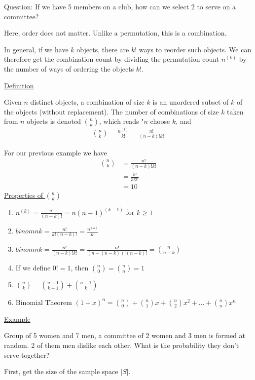 \documentclass{article}
\begin{document}
Question: If we have 5 members on a club, how can we select 2 to serve on a committee?

Here, order does not matter. Unlike a permutation, this is a combination. 

In general, if we have $k$ objects, there are $k!$ ways to reorder such objects. We can therefore get the combination count by dividing the permutation count $n^{(k)}$ by the number of ways of ordering the objects $k!$.

\underline{Definition}

Given $n$ distinct objects, a combination of size $k$ is an unordered subset of $k$ of the objects (without replacement). The number of combinations of size $k$ taken from $n$ objects is denoted $\binom{n}{k}$, which reads "$n$ choose $k$, and
\begin{align*}
    \binom{n}{k} = \frac{n^{(k)}}{k!} = \frac{n!}{(n-k)!k!}
\end{align*}

For our previous example we have
\begin{align*}
    \binom{n}{k} &= \frac{n!}{(n-k)!k!}\\
    &= \frac{5!}{3!2!}\\
    &= 10
\end{align*}
\underline{Properties of $\binom{n}{k}$}

\begin{enumerate}
    \item $n^{(k)} = \frac{n!}{(n-k)!} = n(n-1)^{(k-1)}$ for $k \ge 1$
    \item $binom{n}{k} = \frac{n!}{k!(n-k)!} = \frac{n^{(k)}}{k!}$
    \item $binom{n}{k} = \frac{n!}{(n-k)!k!} = \frac{n!}{(n-(n-k))!(n-k)!} = \binom{n}{n-k}$
    \item If we define $0! = 1$, then $\binom{n}{0} = \binom{n}{n} = 1$
    \item $\binom{n}{k} = \binom{n-1}{k-1} + \binom{n-1}{k}$
    \item Binomial Theorem $(1 + x)^n = \binom{n}{0} + \binom{n}{1}x + \binom{n}{2}x^2 + \ldots + \binom{n}{n}x^n$
\end{enumerate}

\underline{Example}

Group of 5 women and 7 men, a committee of 2 women and 3 men is formed at random. 2 of them men dislike each other. What is the probability they don't serve together?

First, get the size of the sample space $|S|$.
\end{document}

